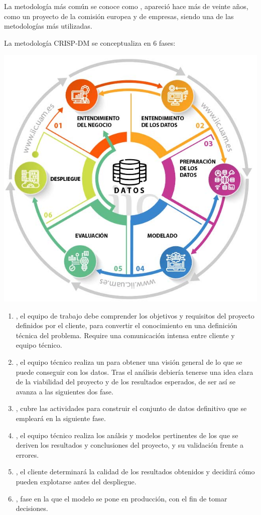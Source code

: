 La metodología más común se conoce como , apareció hace más de veinte años, como un proyecto de la comisión europea y de empresas, siendo una de las metodologías más utilizadas.

La metodología CRISP-DM se conceptualiza en 6 fases:

\begin{center}
    \includegraphics[scale=.6]{images/mod01-17.png}
\end{center}

\begin{enumerate}
    \item {}, el equipo de trabajo debe comprender los objetivos y requisitos del proyecto definidos por el cliente, para convertir el conocimiento en una definición técnica del problema. Require una comunicación intensa entre cliente y equipo técnico.
    \item {}, el equipo técnico realiza un  para obtener una visión general de lo que se puede conseguir con los datos. Tras el análisis debiería tenerse una idea clara de la viabilidad del proyecto y de los resultados esperados, de ser así se avanza a las siguientes dos fase.
    \item {}, cubre las actividades para construir el conjunto de datos definitivo que se empleará en la siguiente fase.
    \item {}, el equipo técnico realiza los análsis y modelos pertinentes de los que se deriven los resultados y conclusiones del proyecto, y su validación frente a errores.
    \item {}, el cliente determinará la calidad de los resultados obtenidos y decidirá cómo pueden explotarse antes del despliegue.
    \item {}, fase en la que el modelo se pone en producción, con el fin de tomar decisiones.
\end{enumerate}

